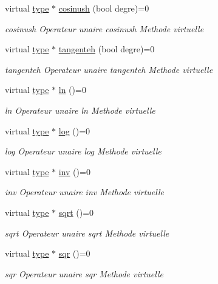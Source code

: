 \begin{DoxyCompactItemize}
virtual \hyperlink{classtype}{type} $\ast$ \hyperlink{classnocomplex_ae92516f1c7c78298a11e8e34355b9f81}{cosinush} (bool degre)=0
\begin{DoxyCompactList}\small\item\em cosinush Operateur unaire cosinush Methode virtuelle \end{DoxyCompactList}\item 
virtual \hyperlink{classtype}{type} $\ast$ \hyperlink{classnocomplex_a79aa6c234a5a66bfe18c39794e56c277}{tangenteh} (bool degre)=0
\begin{DoxyCompactList}\small\item\em tangenteh Operateur unaire tangenteh Methode virtuelle \end{DoxyCompactList}\item 
virtual \hyperlink{classtype}{type} $\ast$ \hyperlink{classnocomplex_ab3e91b96595fef9d53a5cfb93291c8f0}{ln} ()=0
\begin{DoxyCompactList}\small\item\em ln Operateur unaire ln Methode virtuelle \end{DoxyCompactList}\item 
virtual \hyperlink{classtype}{type} $\ast$ \hyperlink{classnocomplex_a0f7a5802123786d1461271d5c05158ca}{log} ()=0
\begin{DoxyCompactList}\small\item\em log Operateur unaire log Methode virtuelle \end{DoxyCompactList}\item 
virtual \hyperlink{classtype}{type} $\ast$ \hyperlink{classnocomplex_a9e0f97f51c50b11022c6d0b409c26ecf}{inv} ()=0
\begin{DoxyCompactList}\small\item\em inv Operateur unaire inv Methode virtuelle \end{DoxyCompactList}\item 
virtual \hyperlink{classtype}{type} $\ast$ \hyperlink{classnocomplex_a7f693a0869814705bcc3b8add799e6cd}{sqrt} ()=0
\begin{DoxyCompactList}\small\item\em sqrt Operateur unaire sqrt Methode virtuelle \end{DoxyCompactList}\item 
virtual \hyperlink{classtype}{type} $\ast$ \hyperlink{classnocomplex_a5665f2bcf5ad839e92c31f38f3dfc7b7}{sqr} ()=0
\begin{DoxyCompactList}\small\item\em sqr Operateur unaire sqr Methode virtuelle \end{DoxyCompactList}\item 

\end{DoxyCompactItemize}
